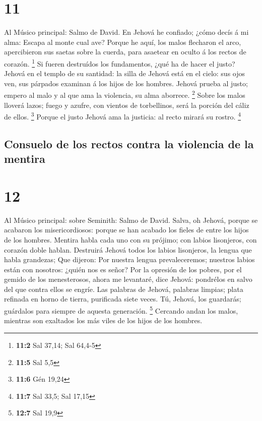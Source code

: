 \hypertarget{section-10}{%
\section{11}\label{section-10}}

 Al Músico principal: Salmo de David. En Jehová he confiado;
¿cómo decís á mi alma: Escapa al monte cual ave?  Porque he
aquí, los malos flecharon el arco, apercibieron sus saetas sobre la
cuerda, para asaetear en oculto á los rectos de corazón. \footnote{\textbf{11:2}
  Sal 37,14; Sal 64,4-5}  Si fueren destruídos los
fundamentos, ¿qué ha de hacer el justo?  Jehová en el templo
de su santidad: la silla de Jehová está en el cielo: sus ojos ven, sus
párpados examinan á los hijos de los hombres.  Jehová prueba
al justo; empero al malo y al que ama la violencia, su alma aborrece.
\footnote{\textbf{11:5} Sal 5,5}  Sobre los malos lloverá
lazos; fuego y azufre, con vientos de torbellinos, será la porción del
cáliz de ellos. \footnote{\textbf{11:6} Gén 19,24}  Porque
el justo Jehová ama la justicia: al recto mirará su rostro. \footnote{\textbf{11:7}
  Sal 33,5; Sal 17,15}

\hypertarget{consuelo-de-los-rectos-contra-la-violencia-de-la-mentira}{%
\subsection{Consuelo de los rectos contra la violencia de la
mentira}\label{consuelo-de-los-rectos-contra-la-violencia-de-la-mentira}}

\hypertarget{section-11}{%
\section{12}\label{section-11}}

 Al Músico principal: sobre Seminith: Salmo de David. Salva,
oh Jehová, porque se acabaron los misericordiosos: porque se han acabado
los fieles de entre los hijos de los hombres.  Mentira habla
cada uno con su prójimo; con labios lisonjeros, con corazón doble
hablan.  Destruirá Jehová todos los labios lisonjeros, la
lengua que habla grandezas;  Que dijeron: Por nuestra lengua
prevaleceremos; nuestros labios están con nosotros: ¿quién nos es señor?
 Por la opresión de los pobres, por el gemido de los
menesterosos, ahora me levantaré, dice Jehová: pondrélos en salvo del
que contra ellos se engríe.  Las palabras de Jehová,
palabras limpias; plata refinada en horno de tierra, purificada siete
veces.  Tú, Jehová, los guardarás; guárdalos para siempre de
aquesta generación. \footnote{\textbf{12:7} Sal 19,9} 
Cercando andan los malos, mientras son exaltados los más viles de los
hijos de los hombres.

